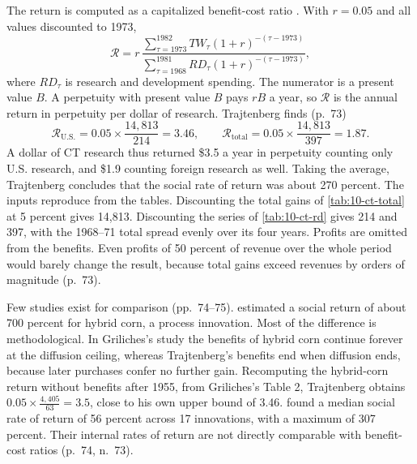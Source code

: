 The return is computed as a capitalized benefit-cost ratio \citep{Griliches1958}. With $r = 0.05$ and all values
discounted to 1973,
\begin{equation}\label{eq:10-traj-ror}
\mathcal{R} = r\,\frac{\sum_{\tau=1973}^{1982}TW_\tau(1+r)^{-(\tau - 1973)}}{\sum_{\tau=1968}^{1981}RD_\tau(1+r)^{-(\tau-1973)}},
\end{equation}
where $RD_\tau$ is research and development spending. The numerator is a present value $B$. A perpetuity with present
value $B$ pays $rB$ a year, so $\mathcal{R}$ is the annual return in perpetuity per dollar of research. Trajtenberg finds
(p.~73)
\begin{equation*}
\mathcal{R}_{\text{U.S.}} = 0.05\times\frac{14{,}813}{214} = 3.46,
\qquad
\mathcal{R}_{\text{total}} = 0.05\times\frac{14{,}813}{397} = 1.87 .
\end{equation*}
A dollar of CT research thus returned \$3.5 a year in perpetuity counting only U.S. research, and \$1.9 counting foreign
research as well. Taking the average, Trajtenberg concludes that the social rate of return was about 270 percent. The
inputs reproduce from the tables. Discounting the total gains of \cref{tab:10-ct-total} at 5 percent gives 14,813.
Discounting the series of \cref{tab:10-ct-rd} gives 214 and 397, with the 1968--71 total spread evenly over its four
years. Profits are omitted from the benefits. Even profits of 50 percent of revenue over the whole period would barely
change the result, because total gains exceed revenues by orders of magnitude (p.~73).

Few studies exist for comparison (pp.~74--75).  estimated a social return of about 700 percent
for hybrid corn, a process innovation. Most of the difference is methodological. In Griliches's study the benefits of
hybrid corn continue forever at the diffusion ceiling, whereas Trajtenberg's benefits end when diffusion ends, because
later purchases confer no further gain. Recomputing the hybrid-corn return without benefits after 1955, from
Griliches's Table 2, Trajtenberg obtains $0.05\times\frac{4{,}405}{63} = 3.5$, close to his own upper bound of 3.46.
 found a median social rate of return of 56 percent across 17 innovations, with a maximum of
307 percent. Their internal rates of return are not directly comparable with benefit-cost ratios (p.~74, n.~73).

